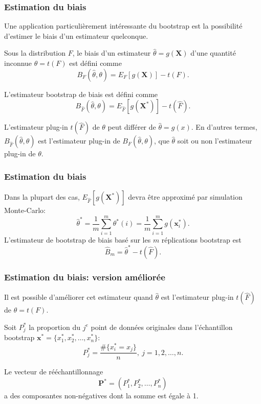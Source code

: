 \documentclass[t,usepdftitle=false]{beamer}
\def\bx{\boldsymbol{x}}
\def\bP{\boldsymbol{P}}
\def\bX{\boldsymbol{X}}
\begin{document}
\begin{frame}
\frametitle{Estimation du biais}

Une application particulièrement intéressante du bootstrap est la
possibilité d'estimer le biais d'un estimateur quelconque.

\mbox{}

Sous la distribution $F$, le biais d'un estimateur $\hat{\theta} =
g(\bX)$ d'une quantité inconnue $\theta = t(F)$ est défini comme
\[
B_F(\hat{\theta}, \theta) = E_F[g(\bX)]-t(F).
\]

\mbox{}

L'estimateur bootstrap de biais est défini comme
\[
B_{\hat{F}}(\hat{\theta}, \theta) = E_{\hat{F}}[g(\bX^*)] - t(\hat{F}).
\]

\mbox{}

L'estimateur plug-in $t(\hat{F})$ de $\theta$ peut différer de
$\hat{\theta} = g(x)$.
En d'autres termes, $B_{\hat{F}}(\hat{\theta}, \theta)$ est
l'estimateur plug-in de $B_{F}(\hat{\theta}, \theta)$, que
$\hat{\theta}$ soit ou non l'estimateur plug-in de $\theta$.

\end{frame}

\begin{frame}
\frametitle{Estimation du biais}

Dans la plupart des cas, $E_{\hat{F}}[g(\bX^*)]$ devra être approximé
par simulation Monte-Carlo:
\[
\hat{\theta}^* = \frac{1}{m}\sum_{i = 1}^{m} \theta^*(i) =
\frac{1}{m}\sum_{i = 1}^{m} g(\bx^*_i).
\]
L'estimateur de bootstrap de biais basé sur les $m$ réplications
bootstrap est
\[
\hat{B}_m = \hat{\theta}^* - t(\hat{F}).
\]

\end{frame}

\begin{frame}
\frametitle{Estimation du biais: version améliorée}

Il est possible d'améliorer cet estimateur 
quand $\hat{\theta}$ est l'estimateur plug-in $t(\hat{F})$ de $\theta
= t(F)$.

\mbox{}

Soit $P^*_j$ la proportion du $j^{e}$ point de données
originales dans l'échantillon bootstrap $\bx^* = \lbrace x_1^*, x_2^*,
\ldots, x_n^* \rbrace$:
\[
P_j^* = \frac{\# \lbrace x_i^* = x_j \rbrace}{n}, \ j = 1,2,\ldots,n.
\]

\mbox{}

Le vecteur de rééchantillonnage
\[
\bP^* = (P_1^*, P_2^*, \ldots, P_n^*)
\]
a des composantes non-négatives dont la somme est égale à 1.

\end{frame}
\end{document}
